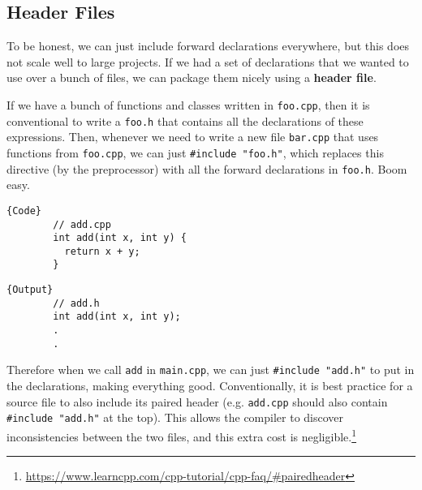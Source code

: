 \documentclass{article}
\begin{document}
  \subsection{Header Files} 

    To be honest, we can just include forward declarations everywhere, but this does not scale well to large projects. If we had a set of declarations that we wanted to use over a bunch of files, we can package them nicely using a \textbf{header file}. 
    
    If we have a bunch of functions and classes written in \texttt{foo.cpp}, then it is conventional to write a \texttt{foo.h} that contains all the declarations of these expressions. Then, whenever we need to write a new file \texttt{bar.cpp} that uses functions from \texttt{foo.cpp}, we can just \texttt{\#include "foo.h"}, which replaces this directive (by the preprocessor) with all the forward declarations in \texttt{foo.h}. Boom easy. 

    \noindent\begin{minipage}{.5\textwidth}
      \begin{lstlisting}[]{Code}
        // add.cpp
        int add(int x, int y) { 
          return x + y;
        }
      \end{lstlisting}
      \end{minipage}
      \hfill
      \begin{minipage}{.49\textwidth}
      \begin{lstlisting}[]{Output}
        // add.h 
        int add(int x, int y); 
        .
        .
      \end{lstlisting}
    \end{minipage}

    Therefore when we call \texttt{add} in \texttt{main.cpp}, we can just \texttt{\#include "add.h"} to put in the declarations, making everything good. Conventionally, it is best practice for a source file to also include its paired header (e.g. \texttt{add.cpp} should also contain \texttt{\#include "add.h"} at the top). This allows the compiler to discover inconsistencies between the two files, and this extra cost is negligible.\footnote{\href{here}{https://www.learncpp.com/cpp-tutorial/cpp-faq/\#pairedheader}} 
\end{document}
